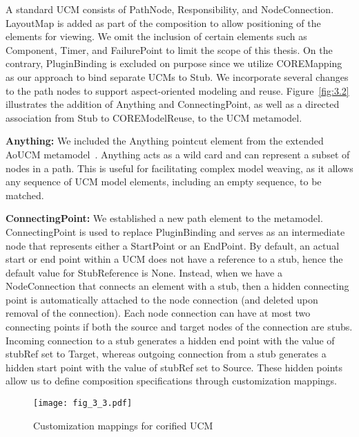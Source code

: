 A standard UCM consists of {\cls PathNode}, {\cls Responsibility}, and {\cls NodeConnection}. {\cls LayoutMap} is added as part of the composition to allow positioning of the elements for viewing. We omit the inclusion of certain elements such as {\cls Component}, {\cls Timer}, and {\cls FailurePoint} to limit the scope of this thesis. On the contrary, {\cls PluginBinding} is excluded on purpose since we utilize {\cls COREMapping} as our approach to bind separate UCMs to {\cls Stub}. We incorporate several changes to the path nodes to support aspect-oriented modeling and reuse. Figure~\ref{fig:3.2} illustrates the addition of {\cls Anything} and {\cls ConnectingPoint}, as well as a directed association from {\cls Stub} to {\cls COREModelReuse}, to the UCM metamodel.

\textbf{\cls Anything:} We included the {\cls Anything} pointcut element from the extended AoUCM metamodel~\cite{mussbacher2011aspect}. {\cls Anything} acts as a wild card and can represent a subset of nodes in a path. This is useful for facilitating complex model weaving, as it allows any sequence of UCM model elements, including an empty sequence, to be matched.

\textbf{\cls ConnectingPoint:} We established a new path element to the metamodel. {\cls ConnectingPoint} is used to replace {\cls PluginBinding} and serves as an intermediate node that represents either a {\cls StartPoint} or an {\cls EndPoint}. By default, an actual start or end point within a UCM does not have a reference to a stub, hence the default value for {\cls StubReference} is {\cls None}. Instead, when we have a {\cls NodeConnection} that connects an element with a stub, then a hidden connecting point is automatically attached to the node connection (and deleted upon removal of the connection). Each node connection can have at most two connecting points if both the source and target nodes of the connection are stubs. Incoming connection to a stub generates a hidden end point with the value of {\cls stubRef} set to {\cls Target}, whereas outgoing connection from a stub generates a hidden start point with the value of {\cls stubRef} set to {\cls Source}. These hidden points allow us to define composition specifications through customization mappings.

\begin{figure}
	\centering
	\texttt{[image: fig\_3\_3.pdf]}
	\caption{Customization mappings for corified UCM}
	\label{fig:3.3}
\end{figure}


